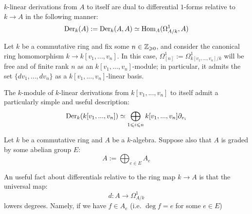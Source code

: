         \begin{corollary}
            $k$-linear derivations from $A$ to itself are dual to differential $1$-forms relative to $k \to A$ in the following manner:
                $$\mathrm{Der}_k(A) := \mathrm{Der}_k(A, A) \simeq \mathrm{Hom}_A(\Omega^1_{A/k}, A)$$
        \end{corollary}
        \begin{lemma}
            \cite[\href{https://stacks.math.columbia.edu/tag/00RX}{Tag 00RX}]{stacks} Let $k$ be a commutative ring and fix some $n \in \mathbb{Z}_{\geqslant 0}$, and consider the canonical ring homomorphism $k \to k[v_1, ..., v_n]$. In this case, $\Omega^1_{[n]} := \Omega^1_{k[v_1, ..., v_n]/k}$ will be free and of finite rank $n$ as an $k[v_1, ..., v_n]$-module; in particular, it admits the set $\{dv_1, ..., dv_n\}$ as a $k[v_1, ..., v_n]$-linear basis.
        \end{lemma}
        \begin{corollary}
            The $k$-module of $k$-linear derivations from $k[v_1, ..., v_n]$ to itself admit a particularly simple and useful description:
                $$\mathrm{Der}_k(k[v_1, ..., v_n]) \simeq \bigoplus_{1 \leqslant i \leqslant n} k[v_1, ..., v_n] \partial_{v_i}$$
        \end{corollary}
        \begin{remark}
            Let $k$ be a commutative ring and $A$ be a $k$-algebra. Suppose also that $A$ is graded by some abelian group $E$:
                $$A := \bigoplus_{e \in E} A_e$$
        
            An useful fact about differentials relative to the ring map $k \to A$ is that the universal map:
                $$d: A \to \Omega^1_{A/k}$$
            lowers degrees. Namely, if we have $f \in A_e$ (i.e. $\deg f = e$ for some $e \in E$)
        \end{remark}

